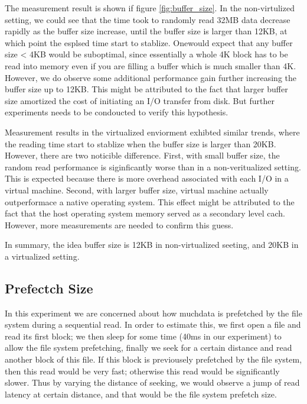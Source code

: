 The measurement result is shown if figure \ref{fig:buffer_size}. In the non-virtulized setting, we could see that the time took to randomly read 32MB data decrease rapidly as the buffer size increase, until the buffer size is larger than 12KB, at which point the esplsed time start to stablize. Onewould expect that any buffer size < 4KB would be suboptimal, since essentially a whole 4K block has to be read into memory even if you are filling a buffer which is much smaller than 4K. However, we do observe some additional performance gain further increasing the buffer size up to 12KB. This might be attributed to the fact that larger buffer size amortized the cost of initiating an I/O transfer from disk. But further experiments needs to be condoucted to verify this hypothesis. 

Measurement results in the virtualized enviorment exhibted similar trends, where the reading time start to stablize when the buffer size is larger than 20KB. However, there are two noticible difference. First, with small buffer size, the random read performance is siginficantly worse than in a non-veritualized setting. This is expected because there is more overhead associated with each I/O in a virtual machine. Second, with larger buffer size, virtual machine actually outperformace a native operating system. This effect might be attributed to the fact that the host operating system memory served as a secondary level cach. However, more measurements are needed to confirm this guess. 

In summary, the idea buffer size is 12KB in non-virtualized seeting, and 20KB in a virtualized setting.

\subsection{Prefectch Size}
In this experiment we are concerned about how muchdata is prefetched by the file system during a sequential read. In order to estimate this, we first open a file and read its first block; we then sleep for some time (40ms in our experiment) to allow the file system prefetching, finally we seek for a certain distance and read another block of this file. If this block is previousely prefetched by the file system, then this read would be very fast; otherwise this read would be significantly slower. Thus by varying the distance of seeking, we would observe a jump of read latency at certain distance, and that would be the file system prefetch size. 

